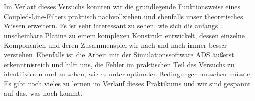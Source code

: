 Im Verlauf dieses Versuchs konnten wir die grundlegende Funktionsweise eines Coupled-Line-Filters praktisch nachvollziehen und ebenfalls unser theoretisches Wissen erweitern. Es ist sehr interessant zu sehen, wie sich die anfangs unscheinbare Platine zu einem komplexen Konstrukt entwickelt, dessen einzelne Komponenten und deren Zusammenspiel wir nach und nach immer besser verstehen. Ebenfalls ist die Arbeit mit der Simulationssoftware ADS äußerst erkenntnisreich und hilft uns, die Fehler im praktischen Teil des Versuchs zu identifizieren und zu sehen, wie es unter optimalen Bedingungen aussehen müsste. Es gibt noch vieles zu lernen im Verlauf dieses Praktikums und wir sind gespannt auf das, was noch kommt.
\clearpage